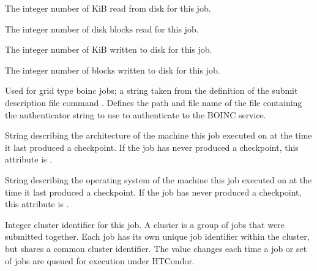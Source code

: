 \begin{description}
\item[\AdAttr{BlockReadKbytes}:] The integer number of KiB
read from disk for this job.

\item[\AdAttr{BlockReads}:] The integer number of disk blocks
read for this job.

\item[\AdAttr{BlockWriteKbytes}:] The integer number of KiB
written to disk for this job.

\item[\AdAttr{BlockWrites}:] The integer number of blocks
written to disk for this job.

\item[\AdAttr{BoincAuthenticatorFile}:] 
Used for grid type boinc jobs;
a string taken from the definition of the submit description file command
.
Defines the path and file name of the file containing the authenticator
string to use to authenticate to the BOINC service.

\item[\AdAttr{CkptArch}:]  String describing the architecture of the machine
this job executed on at the time it last produced a checkpoint.
If the job has never produced a checkpoint,
this attribute is .

\item[\AdAttr{CkptOpSys}:]  String describing the operating system of
the machine
this job executed on at the time it last produced a checkpoint.
If the job has never produced a checkpoint,
this attribute is .

\item[\AdAttr{ClusterId}:]  Integer cluster identifier for this job.
A cluster is a group of jobs that were submitted together.  Each
job has its own unique job identifier within the cluster, but shares a
common cluster identifier.
The value changes each time a job or set of jobs are queued for
execution under HTCondor.


\end{description}
